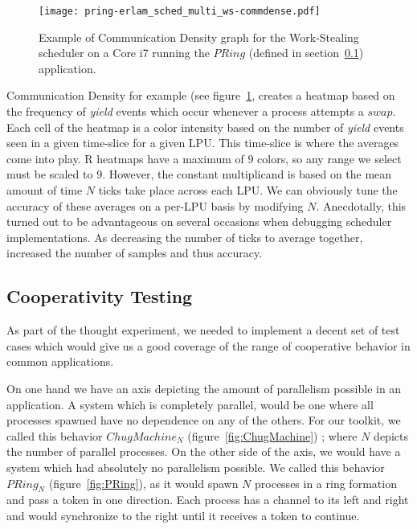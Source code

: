 \begin{figure}
\centering
\texttt{[image: pring-erlam\_sched\_multi\_ws-commdense.pdf]}
\caption{ Example of Communication Density graph for the Work-Stealing scheduler 
on a Core i7 running the $PRing$ (defined in section~\ref{sec:cooperativity testing})
application.}
\label{fig:commdense-example}
\end{figure}

Communication Density for example (see figure~\ref{fig:commdense-example}, 
creates a heatmap based on the frequency of
\emph{yield} events which occur whenever a process attempts a $swap$. Each cell
of the heatmap is a color intensity based on the number of \emph{yield} events 
seen in a given time-slice for a given LPU. This time-slice is where the averages
come into play. R heatmaps have a maximum of $9$ colors, so any range we 
select must be scaled to $9$. However, the constant multiplicand is based on the
mean amount of time $N$ ticks take place across each LPU.
We can obviously tune the accuracy of these averages on a per-LPU basis by
modifying $N$. Anecdotally, this turned out to be advantageous on several 
occasions when debugging scheduler implementations. As decreasing the number of
ticks to average together, increased the number of samples and thus accuracy.

\subsection{Cooperativity Testing}\label{sec:cooperativity testing}

As part of the thought experiment, we needed to implement a decent set of test 
cases which would give us a good coverage of the range of cooperative behavior
in common applications. 

On one hand we have an axis depicting the amount of parallelism possible in an 
application. A system which is completely parallel, would be one where all 
processes spawned have no dependence on any of the others. For our toolkit, we 
called this behavior $ChugMachine_N$ (figure~\ref{fig:ChugMachine}) ; where $N$ depicts the number of parallel 
processes. On the other side of the axis, we would have a system which had 
absolutely no parallelism possible. We called this behavior $PRing_N$ (figure~\ref{fig:PRing}), as it
would spawn $N$ processes in a ring formation and pass a token in one direction.
Each process has a channel to its left and right and would synchronize to the 
right until it receives a token to continue. 

